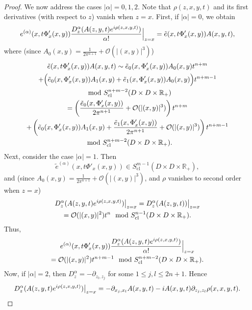 \documentclass{article}
\newcommand{\RR}{\mathbb R}
\newcommand{\mco}{\mathcal O}
\DeclareMathOperator{\cl}{cl}
\begin{document}
\begin{proof}
We now address the cases $|\alpha| = 0,1,2$. Note that $\rho(z,x,y,t)$ and its first derivatives (with respect to $z$) vanish when $z=x$. First, if $|\alpha| = 0$, we obtain
\begin{equation*} e^{(\alpha)}(x, t\Phi'_x(x,y)) \frac{D^\alpha_z(A(z,y,t) e^{i \rho(z,x,y,t)})}{\alpha!} \Big{|}_{z=x}= \tilde e(x, t\Phi'_x(x,y)) A(x,y,t),\end{equation*}
where (since $A_0(x,y) = \frac 1 {2\pi^{n+1}} + \mco(|(x,y)|^3)$)
\begin{multline*} \tilde e(x, t\Phi'_x(x,y)) A(x,y,t) \sim \tilde e_0(x, \Phi'_x(x,y)) A_0(x,y) t^{n+m} \\+ \Big{(}\tilde e_0(x, \Phi'_x(x,y)) A_1(x,y) + \tilde e_1(x, \Phi'_x(x,y)) A_0(x,y)\Big{)} t^{n+m-1} \\ \mod S^{n+m-2}_{\cl}(D \times D \times \RR_+)\\ = \left(\frac{\tilde e_0(x, \Phi'_x(x,y))}{2\pi^{n+1}} + \mco(|(x,y)|^3)\right)t^{n+m} \\+ \left(\tilde e_0(x, \Phi'_x(x,y)) A_1(x,y) + \frac{\tilde e_1(x, \Phi'_x(x,y))}{2\pi^{n+1}}  + \mco(|(x,y)|^3)\right) t^{n+m-1}\\ \mod S^{n+m-2}_{\cl}(D \times D \times \RR_+). \end{multline*}
%
%
%
Next, consider the case $|\alpha| = 1$. Then
\begin{equation*} \tilde e^{(\alpha)}(x, t\Phi'_x(x,y)) \in S^{m-1}_{\cl}(D \times D \times \RR_+),\end{equation*}
and (since $A_0(x,y) = \frac 1 {2\pi^{n+1}} + \mco(|(x,y)|^3)$, and $\rho$ vanishes to second order when $z = x$)
\begin{multline*} D^\alpha_z(A(z,y,t) e^{i \rho(z,x,y,t)})\big{|}_{z=x} = D^\alpha_z(A(z,y,t))\big{|}_{z=x}\\ = \mco(|(x,y)|^2)t^n \mod S^{n-1}_{\cl}(D \times D \times \RR_+).\end{multline*}
Thus,
%
\begin{multline*} e^{(\alpha)}(x, t\Phi'_x(x,y)) \frac{D^\alpha_z(A(z,y,t) e^{i \rho(z,x,y,t)})}{\alpha!} \Big{|}_{z=x}  \\= \mco(|(x,y)|^2) t^{n+m-1} \mod S^{n+m-2}_{\cl}(D \times D \times \RR_+).\end{multline*}
%
%
%
Now, if $|\alpha| = 2$, then $D^\alpha_z = -\partial_{z_l, z_j}$ for some $1 \le j,l \le 2n+1$. Hence
\begin{equation*} D^\alpha_z(A(z,y,t) e^{i\rho(z,x,y,t)})\big{|}_{z=x} = - \partial_{x_j, x_l} A(x,y,t) -i A(x,y,t) \partial_{z_j, z_l} \rho(x,x,y,t).\end{equation*}

\end{proof}
\end{document}

